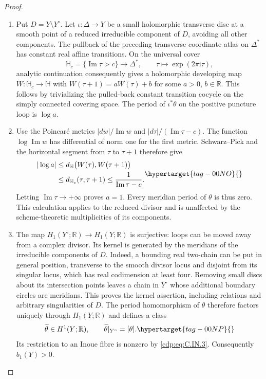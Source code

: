 \begin{proof}
\begin{enumerate}[leftmargin=*]
\item Put
$D=Y\setminus Y^\circ$. Let $\iota:\Delta\to Y$ be a small
holomorphic transverse disc at a smooth point of a reduced
irreducible component of $D$, avoiding all other components.
The pullback of the preceding transverse coordinate atlas on
$\Delta^*$ has constant real affine transitions. On the universal
cover
\[
 \mathbb H_c=\{\operatorname{Im}\tau>c\}
 \longrightarrow\Delta^*,\qquad
 \tau\longmapsto\exp(2\pi\mathrm i\tau),
\]
analytic continuation consequently gives a holomorphic developing
map $W:\mathbb H_c\to\mathbb H$ with
$W(\tau+1)=aW(\tau)+b$ for some $a>0$, $b\in\mathbb R$.
This follows by trivializing the pulled-back constant transition
cocycle on the simply connected covering space.
The period of $\iota^*\theta$ on the positive puncture loop is
$\log a$.

\item Use the Poincar\'e metrics
$|dw|/\operatorname{Im}w$ and
$|d\tau|/(\operatorname{Im}\tau-c)$.
The function $\log\operatorname{Im}w$ has differential of norm
one for the first metric. Schwarz--Pick and the horizontal segment
from $\tau$ to $\tau+1$ therefore give
\begin{equation}
\begin{aligned}
 |\log a|
 &\le d_{\mathbb H}\bigl(W(\tau),W(\tau+1)\bigr)\\
 &\le d_{\mathbb H_c}(\tau,\tau+1)
 \le\frac{1}{\operatorname{Im}\tau-c}.
\end{aligned}
\hypertarget{tag-00NO}{}\label{cdp:eq:C.IN.5}
\end{equation}
Letting $\operatorname{Im}\tau\to+\infty$ proves $a=1$.
Every meridian period of $\theta$ is thus zero. This calculation
applies to the reduced divisor and is unaffected by the
scheme-theoretic multiplicities of its components.

\item The map $H_1(Y^\circ;\mathbb R)\to H_1(Y;\mathbb R)$ is
surjective: loops can be moved away from a complex divisor.
Its kernel is generated by the meridians of the irreducible
components of $D$. Indeed, a bounding real two-chain can be put
in general position, transverse to the smooth divisor locus and
disjoint from its singular locus, which has real codimension at
least four. Removing small discs about its intersection points
leaves a chain in $Y^\circ$ whose additional boundary circles
are meridians. This proves the kernel assertion, including
relations and arbitrary singularities of $D$.
The period homomorphism of $\theta$ therefore factors uniquely
through $H_1(Y;\mathbb R)$ and defines a class
\begin{equation}
 \widetilde\theta\in H^1(Y;\mathbb R),\qquad
 \widetilde\theta|_{Y^\circ}=[\theta].
\hypertarget{tag-00NP}{}\label{cdp:eq:C.IN.6}
\end{equation}
Its restriction to an Inoue fibre is nonzero by \eqref{cdp:eq:C.IN.3}.
Consequently $b_1(Y)>0$.


\end{enumerate}
\end{proof}
